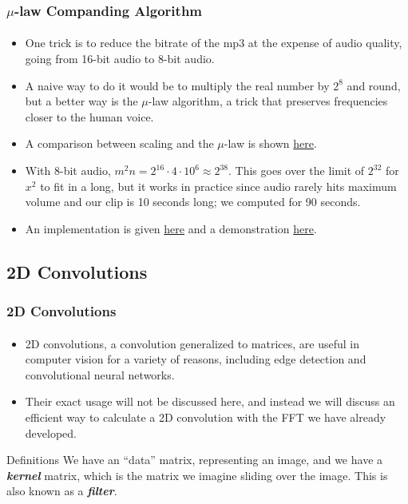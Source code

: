 \documentclass{beamer}                             %
\newcommand{\emphasis}[1]{\textbf{\textit{#1}}}
\begin{document}
\begin{frame}
\frametitle{\( \mu \)-law Companding Algorithm}
\framesubtitle{}
\begin{itemize}[<+->]
  \item One trick is to reduce the bitrate of the mp3 at the expense
    of audio quality, going from 16-bit audio to 8-bit audio.
  \item A naive way to do it would be to multiply the real number by \( 2^8 \)
    and round, but a better way is the \( \mu \)-law algorithm,
    a trick that preserves frequencies closer to the human voice.
  \item A comparison between scaling and the \( \mu \)-law
    is shown \href{https://youtu.be/PqkE_t5cCoA}{here}.
  \item With 8-bit audio, \( m^2 n = 2^{16} \cdot 4 \cdot 10^6 \approx 2^{38} \).
    This goes over the limit of \( 2^{32} \) for \( x^2 \) to fit in a long,
    but it works in practice since audio rarely hits maximum volume and our clip
    is 10 seconds long; we computed for 90 seconds.
  \item An implementation is given 
    \href{https://github.com/stephen-huan/anime-music-quiz}{here} and
    a demonstration \href{https://youtu.be/7fUicc_lIGA}{here}.
\end{itemize}
\end{frame}

\subsection{2D Convolutions}
\begin{frame}
\frametitle{2D Convolutions}
\framesubtitle{}
\begin{itemize}
  \item 2D convolutions, a convolution generalized to matrices,
    are useful in computer vision for a variety of reasons,
    including edge detection and convolutional neural networks.
  \item Their exact usage will not be discussed here, and
    instead we will discuss an efficient way to calculate a
    2D convolution with the FFT we have already developed.
\end{itemize}
\begin{alertblock}{Definitions}
  We have an \enquote{data} matrix, representing an image,
  and we have a \emphasis{kernel} matrix, which is the matrix we imagine
  sliding over the image. This is also known as a \emphasis{filter}.
\end{alertblock}
\end{frame}
\end{document}
